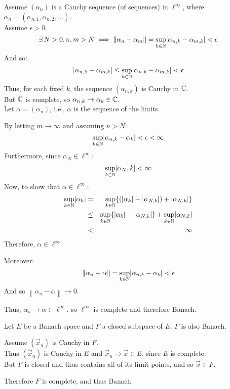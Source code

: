 \documentclass[letterpaper,12pt,fleqn]{article}
\newcommand{\norm}[1]{\left\|#1\right\|}
\renewcommand{\a}{\alpha}
\newcommand{\e}{\epsilon}
\newcommand{\vx}{\vec{x}}
\begin{document}
\begin{examples}
\begin{enumerate}
    Assume $(\a_n)$ is a Cauchy sequence (of sequences) in $\ell^{\infty}$,
    where $\a_n=(\a_{n,1},\a_{n,2},\ldots)$. \\
    Assume $\e>0$.
    \[\exists\,N>0,n,m>N\implies\norm{\a_n-\a_m}=
    \sup_{k\in\N}\abs{\a_{n,k}-\a_{m,k}}<\e\]
    And so:
    \[\abs{\a_{n,k}-\a_{m,k}}\le\sup_{k\in\N}\abs{\a_{n,k}-\a_{m,k}}<\e\]
    Thus, for each fixed $k$, the sequence $(\a_{n,k})$ is Cauchy in $\mathbb{C}$. \\
    But $\mathbb{C}$ is complete, so $\a_{n,k}\to\a_k\in\C$. \\
    Let $\a=(\a_n)$, i.e., $\a$ is the sequence of the limits.

    By letting $m\to\infty$ and assuming $n>N$:
    \[\sup_{k\in\N}\abs{\a_{n,k}-\a_k}<\e<\infty\]
    Furthermore, since $\a_N\in\ell^{\infty}$:
    \[\sup_{k\in\N}\abs{\a_N,k}<\infty\]
    Now, to show that $\a\in\ell^{\infty}$:
    \begin{eqnarray*}
      \sup_{k\in\N}\abs{\a_k} &=&
      \sup_{k\in\N}\{(\abs{\a_k}-\abs{\a_{N,k}})+\abs{\a_{N,k}}\} \\
      &\le& \sup_{k\in\N}\{\abs{\a_k}-\abs{\a_{N,k}}\}+
      \sup_{k\in\N}\abs{\a_{N,k}} \\
      &<& \infty
    \end{eqnarray*}
    Therefore, $\a\in\ell^{\infty}$.

    Moreover:
    \[\norm{\a_n-\a}=\sup_{k\in\N}\abs{\a_{n,k}-\a_k}<\e\]
    And so $\norm{\a_n-\a}\to0$.

    Thus, $\a_n\to\a\in\ell^{\infty}$, so $\ell^{\infty}$ is complete and
    therefore Banach.
  \end{enumerate}
\end{examples}

\begin{theorem}
  Let $E$ be a Banach space and $F$ a closed subspace of $E$. $F$ is also
  Banach.
\end{theorem}

\begin{theproof}
  Assume $(\vx_n)$ is Cauchy in $F$. \\
  Thus $(\vx_n)$ is Cauchy in $E$ and $\vx_n\to\vx\in E$, since $E$ is
  complete. \\
  But $F$ is closed and thus contains all of its limit points, and so
  $\vx\in F$.

  Therefore $F$ is complete, and thus Banach.
\end{theproof}
\end{document}
